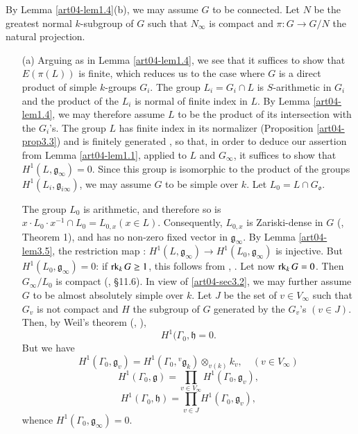 By Lemma \ref{art04-lem1.4}(b), we may assume $G$ to be connected. Let $N$ be the greatest normal $k$-subgroup of $G$ such that $N_{\infty}$ is compact and $\pi:G\to G/N$ the natural projection.
\begin{itemize}
\item[(a)] Arguing as in Lemma \ref{art04-lem1.4}, we see that it suffices to show that $E(\pi(L))$ is finite, which reduces us to the case where $G$ is a direct product of simple $k$-groups $G_{i}$. The group $L_{i}=G_{i}\cap L$ is $S$-arithmetic in $G_{i}$ and the product of the $L_{i}$ is normal of finite index in $L$. By Lemma \ref{art04-lem1.4}, we may therefore assume $L$ to be the product of its intersection with the $G_{i}$'s. The group $L$ has finite index in its normalizer (Proposition \ref{art04-prop3.3}) and is finitely generated \cite{art04-key17}, so that, in order to deduce our assertion from Lemma \ref{art04-lem1.1}, applied to $L$ and $G_{\infty}$, it suffices to show that $H^{1}(L,\mathfrak{g}_{\infty})=0$. Since this group is isomorphic to the product of the groups $H^{1}(L_{i},\mathfrak{g}_{i\infty})$, we may assume $G$ to be simple over $k$. Let $L_{0}=L\cap G_{\mathfrak{o}}$.

The group $L_{0}$ is arithmetic, and therefore so is $x\cdot L_{0}\cdot x^{-1}\cap L_{0}=L_{0,x}(x\in L)$. Consequently, $L_{0,x}$ is Zariski-dense in $G$ (\cite{art04-key6}, Theorem 1), and has no non-zero fixed vector in $\mathfrak{g}_{\infty}$. By Lemma \ref{art04-lem3.5}, the restriction map : $H^{1}(L,\mathfrak{g}_{\infty})\to H^{1}(L_{0},\mathfrak{g}_{\infty})$ is injective. But $H^{1}(L_{0},\mathfrak{g}_{\infty})=0$: if $\operatorname{\mathrm{rk}}_{k}G\geq 1$, this follows from \cite{art04-key25}, \cite{art04-key26}. Let now $\operatorname{\mathrm{rk}}_{k}G=0$. Then $G_{\infty}/L_{0}$ is compact (\cite{art04-key4}, \S11.6). In view of \ref{art04-sec3.2}, we may further assume $G$ to be almost absolutely simple over $k$. Let $J$ be the set of $v\in V_{\infty}$ such that $G_{v}$ is not compact and $H$ the subgroup of $G$ generated by the $G_{v}$'s $(v\in J)$. Then, by Weil's theorem (\cite{art04-key32}, \cite{art04-key33}),
\setcounter{equation}{0}
\begin{equation}
H^{1}(\Gamma_{0},\mathfrak{h}=0.\label{art04-thm3.6-eq1}
\end{equation}
But we have
\begin{equation}
H^{1}(\Gamma_{0},\mathfrak{g}_{v})=H^{1}(\Gamma_{0},{}^{v}\mathfrak{g}_{k})\otimes_{v(k)}k_{v},\quad (v\in V_{\infty})\label{art04-thm3.6-eq2}
\end{equation}
\begin{equation}
H^{1}(\Gamma_{0},\mathfrak{g})=\prod\limits_{v\in V_{\infty}}H^{1}(\Gamma_{0},\mathfrak{g}_{v}),\label{art04-thm3.6-eq3}
\end{equation}
\begin{equation}
H^{1}(\Gamma_{0},\mathfrak{h})=\prod\limits_{v\in J}H^{1}(\Gamma_{0},\mathfrak{g}_{v}),\label{art04-thm3.6-eq4}
\end{equation}
whence $H^{1}(\Gamma_{0},\mathfrak{g}_{\infty})=0$.


\end{itemize}
